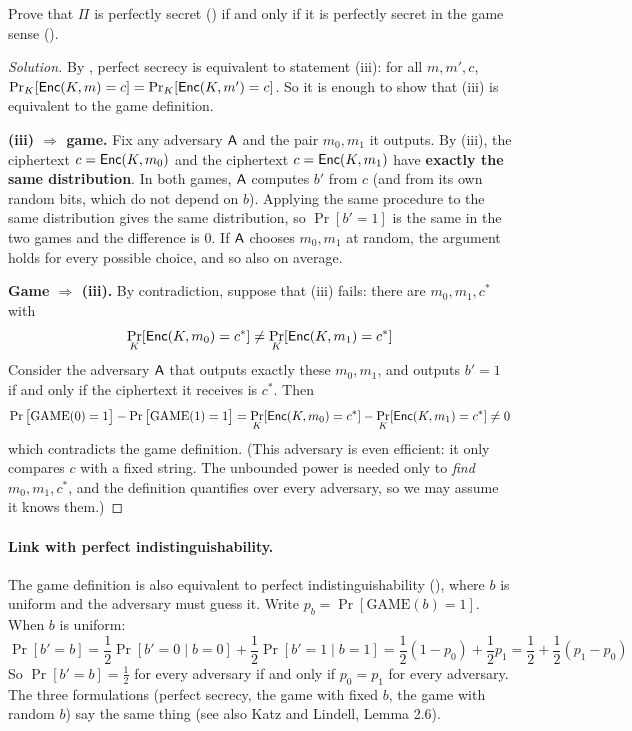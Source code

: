 \begin{framedprob}[label={prob:ps-game}]{}
  Prove that $\Pi$ is perfectly secret () if and only if it is perfectly secret in the game sense ().
\end{framedprob}

\begin{proof}[Solution]
  By , perfect secrecy is equivalent to statement (iii): for all $m, m', c$, $\Pr_K[\mathsf{Enc}(K, m) = c] = \Pr_K[\mathsf{Enc}(K, m') = c]$. So it is enough to show that (iii) is equivalent to the game definition.

  \textbf{(iii) $\Rightarrow$ game.} Fix any adversary $\mathsf{A}$ and the pair $m_0, m_1$ it outputs. By (iii), the ciphertext $c = \mathsf{Enc}(K, m_0)$ and the ciphertext $c = \mathsf{Enc}(K, m_1)$ have \textbf{exactly the same distribution}. In both games, $\mathsf{A}$ computes $b'$ from $c$ (and from its own random bits, which do not depend on $b$). Applying the same procedure to the same distribution gives the same distribution, so $\Pr[b' = 1]$ is the same in the two games and the difference is $0$. If $\mathsf{A}$ chooses $m_0, m_1$ at random, the argument holds for every possible choice, and so also on average.

  \textbf{Game $\Rightarrow$ (iii).} By contradiction, suppose that (iii) fails: there are $m_0, m_1, c^*$ with
  \[
    \Pr_K[\mathsf{Enc}(K, m_0) = c^*] \neq \Pr_K[\mathsf{Enc}(K, m_1) = c^*]
  \]
  Consider the adversary $\mathsf{A}$ that outputs exactly these $m_0, m_1$, and outputs $b' = 1$ if and only if the ciphertext it receives is $c^*$. Then
  \[
    \Pr\big[\mathrm{GAME}(0) = 1\big] - \Pr\big[\mathrm{GAME}(1) = 1\big] = \Pr_K[\mathsf{Enc}(K, m_0) = c^*] - \Pr_K[\mathsf{Enc}(K, m_1) = c^*] \neq 0
  \]
  which contradicts the game definition. (This adversary is even efficient: it only compares $c$ with a fixed string. The unbounded power is needed only to \textit{find} $m_0, m_1, c^*$, and the definition quantifies over every adversary, so we may assume it knows them.)
\end{proof}

\paragraph{Link with perfect indistinguishability.} The game definition is also equivalent to perfect indistinguishability (), where $b$ is uniform and the adversary must guess it. Write $p_b = \Pr[\mathrm{GAME}(b) = 1]$. When $b$ is uniform:
\[
  \Pr[b' = b] = \frac{1}{2}\Pr[b' = 0 \mid b = 0] + \frac{1}{2}\Pr[b' = 1 \mid b = 1] = \frac{1}{2}(1 - p_0) + \frac{1}{2}p_1 = \frac{1}{2} + \frac{1}{2}(p_1 - p_0)
\]
So $\Pr[b' = b] = \frac{1}{2}$ for every adversary if and only if $p_0 = p_1$ for every adversary. The three formulations (perfect secrecy, the game with fixed $b$, the game with random $b$) say the same thing (see also Katz and Lindell, Lemma 2.6).

